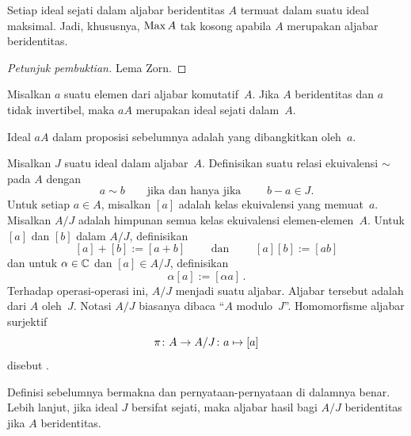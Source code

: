  \begin{prop}\label{000552} Setiap ideal sejati dalam aljabar beridentitas $A$ termuat dalam suatu
 ideal maksimal. Jadi, khususnya, $\operatorname{Max} A$ tak kosong apabila $A$ merupakan aljabar beridentitas.
\end{prop}

\begin{proof}[\emph{Petunjuk pembuktian}] Lema Zorn. \ns  \end{proof}

\begin{prop}\label{000553} Misalkan $a$ suatu elemen dari aljabar komutatif~$A$. Jika $A$
beridentitas dan $a$ tidak invertibel, maka $aA$ merupakan ideal sejati dalam~$A$.
\end{prop}

\begin{defn}\label{000554} Ideal $aA$ dalam proposisi sebelumnya adalah
 yang dibangkitkan oleh~$a$.
\end{defn}

\begin{defn}\label{000555} Misalkan $J$ suatu ideal dalam aljabar~$A$. Definisikan suatu
relasi ekuivalensi $\sim$ pada $A$ dengan
  \[ a \sim b \qquad \text{jika dan hanya jika } \qquad b-a \in J. \]
Untuk setiap $a \in A$, misalkan $[a]$ adalah kelas ekuivalensi yang memuat~$a$. Misalkan $A/J$ adalah
himpunan semua kelas ekuivalensi elemen-elemen~$A$. Untuk $[a]$ dan $[b]$ dalam $A/J$, definisikan
  \[ [a] + [b] := [a+b] \qquad \text{ dan } \qquad [a][b] := [ab] \]
dan untuk $\alpha \in \mathbb{C}$ dan $[a] \in A/J$, definisikan
  \[\alpha[a] := [\alpha a] \,. \]
Terhadap operasi-operasi ini, $A/J$ menjadi suatu aljabar. Aljabar tersebut adalah
 dari $A$ oleh~$J$. Notasi $A/J$ biasanya dibaca ``$A$ modulo~$J$''.
Homomorfisme aljabar surjektif
  \[ \pi\colon A \rightarrow A/J\colon a \mapsto [a]\]
disebut
.
\end{defn}

\begin{prop} Definisi sebelumnya bermakna dan pernyataan-pernyataan di dalamnya benar.
Lebih lanjut, jika ideal $J$ bersifat sejati, maka aljabar hasil bagi $A/J$ beridentitas jika $A$ beridentitas.
\end{prop}

